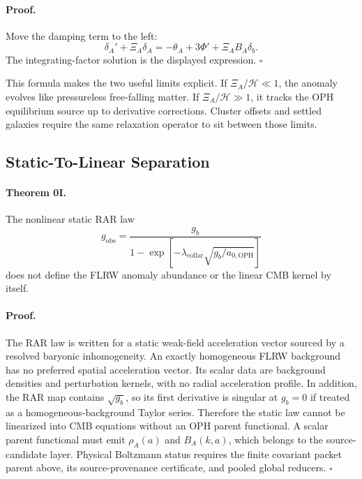 \documentclass[11pt]{article}
\newcommand{\aoph}{a_{0,\mathrm{OPH}}}
\newcommand{\lambdac}{\lambda_{\mathrm{collar}}}
\begin{document}
\paragraph{Proof.}
Move the damping term to the left:
\begin{equation}
  \delta_A' + \Xi_A\delta_A
  =
  -\theta_A+3\Phi' + \Xi_A B_A\delta_b.
\end{equation}
The integrating-factor solution is the displayed expression. \(\square\)

This formula makes the two useful limits explicit.  If
\(\Xi_A/\mathcal H\ll1\), the anomaly evolves like pressureless free-falling
matter.  If \(\Xi_A/\mathcal H\gg1\), it tracks the OPH equilibrium source up
to derivative corrections.  Cluster offsets and settled galaxies require the
same relaxation operator to sit between those limits.

\subsection{Static-To-Linear Separation}

\paragraph{Theorem 0I.}
The nonlinear static RAR law
\begin{equation}
  g_{\mathrm{obs}}
  =
  \frac{g_b}{1-\exp[-\lambdac\sqrt{g_b/\aoph}]}
\end{equation}
does not define the FLRW anomaly abundance or the linear CMB kernel by itself.

\paragraph{Proof.}
The RAR law is written for a static weak-field acceleration vector sourced by a
resolved baryonic inhomogeneity.  An exactly homogeneous FLRW background has no
preferred spatial acceleration vector.  Its scalar data are background
densities and perturbation kernels, with no radial acceleration profile.  In
addition, the RAR map contains \(\sqrt{g_b}\), so its first derivative is
singular at \(g_b=0\) if treated as a homogeneous-background Taylor series.
Therefore the static law cannot be linearized into CMB equations without an
OPH parent functional.  A scalar parent functional must emit
\(\rho_A(a)\) and \(B_A(k,a)\), which belongs to the source-candidate layer.
Physical Boltzmann status requires the finite covariant packet parent above,
its source-provenance certificate, and pooled global reducers. \(\square\)
\end{document}
